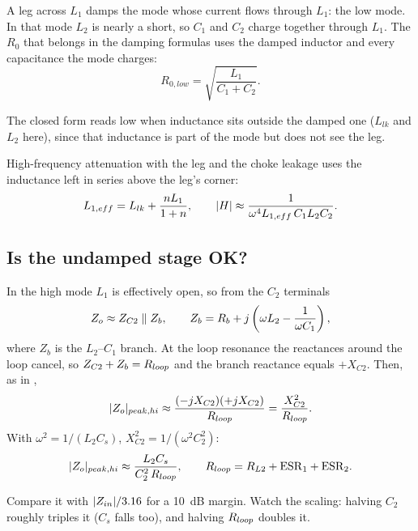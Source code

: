 \begin{idea}
	A leg across $L_1$ damps the mode whose current flows through $L_1$:
	the low mode. In that mode $L_2$ is nearly a short, so $C_1$ and $C_2$
	charge together through $L_1$. The $R_0$ that belongs in the damping
	formulas uses the damped inductor and every capacitance the mode charges:
	\[
		R_{0,low} = \sqrt{\frac{L_1}{C_1 + C_2}}.
	\]
\end{idea}

The closed form reads low when inductance sits outside the damped one
($L_{lk}$ and $L_2$ here), since that inductance is part of the mode but
does not see the leg.

High-frequency attenuation with the leg and the choke leakage uses the
inductance left in series above the leg's corner:
\begin{equation}\label{eq:l1-eff}
	L_{1,eff} = L_{lk} + \frac{nL_1}{1+n}, \qquad
	\lvert H\rvert \approx \frac{1}{\omega^4 L_{1,eff}\,C_1 L_2 C_2}.
\end{equation}

\subsection{Is the undamped stage OK?}
\label{sec:undamped-stage}

\begin{derivation}
	In the high mode $L_1$ is effectively open, so from the $C_2$ terminals
	\[
		Z_o \approx Z_{C2} \parallel Z_b, \qquad
		Z_b = R_b + j\left(\omega L_2 - \frac{1}{\omega C_1}\right),
	\]
	where $Z_b$ is the $L_2$--$C_1$ branch. At the loop resonance the reactances
	around the loop cancel, so $Z_{C2} + Z_b = R_{loop}$ and the branch reactance
	equals $+X_{C2}$. Then, as in ,
	\[
		\lvert Z_o\rvert_{peak,hi} \approx \frac{(-jX_{C2})(+jX_{C2})}{R_{loop}} = \frac{X_{C2}^2}{R_{loop}}.
	\]
	With $\omega^2 = 1/(L_2C_s)$, $X_{C2}^2 = 1/(\omega^2C_2^2)$:
	\begin{equation}\label{eq:zo-hi}
		\lvert Z_o\rvert_{peak,hi} \approx \frac{L_2 C_s}{C_2^2\,R_{loop}}, \qquad
		R_{loop} = R_{L2} + \mathrm{ESR}_1 + \mathrm{ESR}_2.
	\end{equation}
\end{derivation}

Compare it with $\lvert Z_{in}\rvert/3.16$ for a 10~dB margin. Watch the scaling:
halving $C_2$ roughly triples it ($C_s$ falls too), and halving $R_{loop}$ doubles it.

